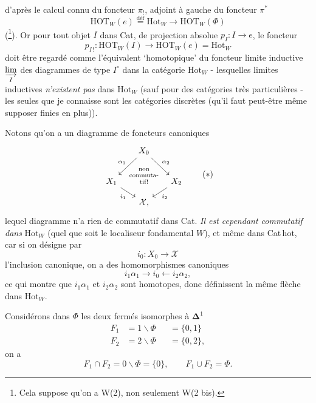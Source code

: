 \documentclass[11pt]{article}
\newcommand{\printedpage}[1]{\marginpar{\footnotesize p.~#1}}
\newcommand{\msp}[1]{\marginpar{\footnotesize [#1]}}
\newcommand{\Hot}{\mathrm{Hot}}
\newcommand{\HOT}{\mathrm{HOT}}
\newcommand{\cX}{\mathcal{X}}
\begin{document}
\printedpage{83}
d'après le calcul connu du foncteur $\pi_!$, adjoint à gauche du foncteur $\pi^*$
\[
\HOT_W(e) \overset{\text{déf}}{=} \Hot_W \longrightarrow \HOT_W(\Phi)
\]
(\footnote[84]{Cela suppose qu'on a W(2), non seulement W(2 bis).}). Or pour tout objet $I$ dans Cat, de projection absolue $p_I : I \longrightarrow e$, le foncteur
\[
p_{I\,!} : \HOT_W(I) \longrightarrow \HOT_W(e) = \Hot_W
\]
doit être regardé comme l'équivalent `homotopique' du foncteur limite inductive $\varinjlim\limits_{I}$ des diagrammes de type $I^{\circ}$ dans la catégorie $\Hot_W$ - lesquelles limites inductives \textit{n'existent pas} dans $\Hot_W$ (sauf
\msp{page 123}
pour des catégories très particulières - les seules que je connaisse sont les catégories discrètes (qu'il faut peut-être même supposer finies en plus)).

Notons qu'on a un diagramme de foncteurs canoniques
\[
\begin{tikzcd}[column sep=tiny, row sep=small, ampersand replacement=\&]
 \& X_0 \arrow[dl, "\alpha_1"'] \arrow[dr, "\alpha_2"] \& \\
X_1 \arrow[dr, "i_1"'] \& {\shortstack{\scriptsize non\\ \scriptsize commuta-\\ \scriptsize tif!}} \& X_2 \arrow[dl, "i_2"] \\
 \& \cX, \&
\end{tikzcd}
\tag*{$(*)$}
\]
lequel diagramme n'a rien de commutatif dans Cat. \textit{Il est cependant commutatif dans} $\Hot_W$ (quel que soit le localiseur fondamental $W$), et même dans Cat\,hot, car si on désigne par
\[
i_0 : X_0 \longrightarrow \cX
\]
l'inclusion canonique, on a des homomorphismes canoniques
\[
i_1\alpha_1 \longrightarrow i_0 \longleftarrow i_2\alpha_2,
\]
ce qui montre que $i_1\alpha_1$ et $i_2\alpha_2$ sont homotopes, donc définissent la même flèche dans $\Hot_W$.

\msp{page 124}
Considérons dans $\Phi$ les deux fermés isomorphes à $\boldsymbol{\Delta}^1$
\[
\begin{aligned}
F_1 &= 1\backslash\Phi &&= \{0,1\}\\
F_2 &= 2\backslash\Phi &&= \{0,2\},
\end{aligned}
\]
on a
\[
F_1\cap F_2 = 0\backslash\Phi = \{0\}, \qquad F_1\cup F_2 = \Phi.
\]
\end{document}
